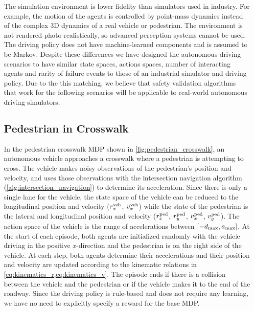 The simulation environment is lower fidelity than simulators used in industry.  For example, the motion of the agents is controlled by point-mass dynamics instead of the complex 3D dynamics of a real vehicle or pedestrian. The environment is not rendered photo-realistically, so advanced perception systems cannot be used. The driving policy does not have machine-learned components and is assumed to be Markov. Despite these differences we have designed the autonomous driving scenarios to have similar state spaces, actions spaces, number of interacting agents and rarity of failure events to those of an industrial simulator and driving policy. Due to the this matching, we believe that safety validation algorithms that work for the following scenarios will be applicable to real-world autonomous driving simulators.


\subsection{Pedestrian in Crosswalk}
In the pedestrian crosswalk MDP shown in \cref{fig:pedestrian_crosswalk}, an autonomous vehicle approaches a crosswalk where a pedestrian is attempting to cross. The vehicle makes noisy observations of the pedestrian's position and velocity, and uses those observations with the intersection navigation algorithm (\cref{alg:intersection_navigation}) to determine its acceleration. Since there is only a single lane for the vehicle, the state space of the vehicle can be reduced to the longitudinal position and velocity ($r_x^{\rm veh}$, $v_x^{\rm veh}$) while the state of the pedestrian is the lateral and longitudinal position and velocity ($r^{\rm ped}_x$, $r^{\rm ped}_y$, $v^{\rm ped}_x$, $v^{\rm ped}_y$). The action space of the vehicle is the range of accelerations between $[-d_{\rm max}, a_{\rm max}]$. At the start of each episode, both agents are initialized randomly with the vehicle driving in the positive $x$-direction and the pedestrian is on the right side of the vehicle. At each step, both agents determine their accelerations and their position and velocity are updated according to the kinematic relations in \cref{eq:kinematics_r,eq:kinematics_v}. The episode ends if there is a collision between the vehicle and the pedestrian or if the vehicle makes it to the end of the roadway. Since the driving policy is rule-based and does not require any learning, we have no need to explicitly specify a reward for the base MDP. 

